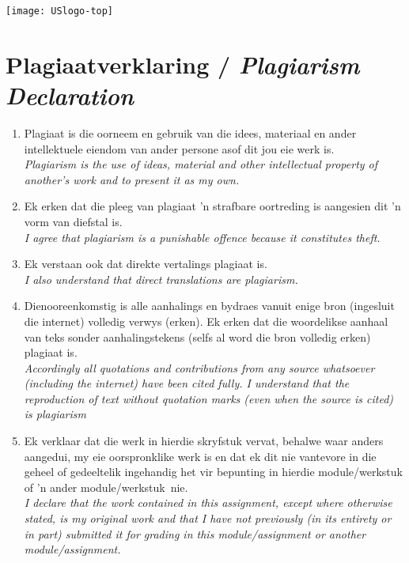 \newpage
\thispagestyle{plain}
\makeatletter{}\makeatother

\centerline{\texttt{[image: USlogo-top]}}
\vspace*{-10pt}

\section*{\centering Plagiaatverklaring / \textit{Plagiarism Declaration}}

\vspace*{5pt}

\begin{enumerate}
    \item Plagiaat is die oorneem en gebruik van die idees, materiaal en ander intellektuele eiendom van ander persone asof dit jou eie werk is.\\
    \textit{Plagiarism is the use of ideas, material and other intellectual property of another's work
        and to present it as my own.}
    
    \item Ek erken dat die pleeg van plagiaat 'n strafbare oortreding is aangesien dit 'n vorm van diefstal is.\\
    \textit{I agree that plagiarism is a punishable offence because it constitutes theft.}
    
    \item Ek verstaan ook dat direkte vertalings plagiaat is. \\
    \textit{I also understand that direct translations are plagiarism.}
    
    \item Dienooreenkomstig is alle aanhalings en bydraes vanuit enige bron (ingesluit die internet) volledig verwys (erken). Ek erken dat die woordelikse aanhaal van teks sonder aanhalingstekens (selfs al word die bron volledig erken) plagiaat is. \\
    \textit{Accordingly all quotations and contributions from any source whatsoever (including the internet) have been cited fully. I understand that the reproduction of text without quotation marks (even when the source is cited) is plagiarism}
    
    \item Ek verklaar dat die werk in hierdie skryfstuk vervat, behalwe waar anders aangedui, my eie oorspronklike werk is en dat ek dit nie vantevore in die geheel of gedeeltelik ingehandig het vir bepunting in hierdie module/werkstuk of 'n ander module/werkstuk~nie. \\
    \textit{I declare that the work contained in this assignment, except where otherwise stated, is my original work and that I have not previously (in its entirety or in part) submitted it for grading in this module/assignment or another module/assignment.}
\end{enumerate}

